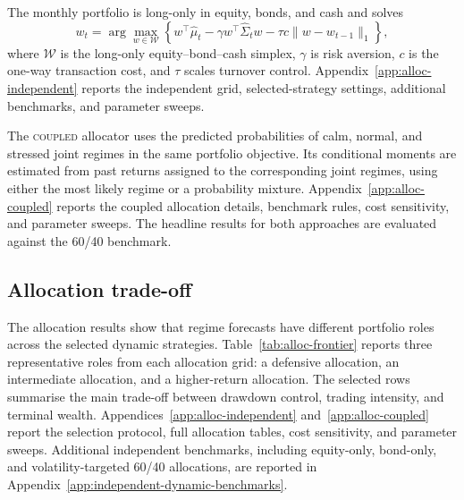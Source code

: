 ﻿\documentclass[10pt]{article}
\newcommand{\Acoup}{\textsc{coupled}}
\begin{document}
The monthly portfolio is long-only in equity, bonds, and cash and solves
\begin{equation}
    w_t
    =
    \arg\max_{w\in\mathcal W}
    \left\{
    w^{\top}\hat\mu_t
    -
    \gamma w^{\top}\hat\Sigma_t w
    -
    \tau c \lVert w-w_{t-1}\rVert_1
    \right\},
    \label{eq:mv}
\end{equation}
where \(\mathcal W\) is the long-only equity--bond--cash simplex, \(\gamma\) is risk aversion,
\(c\) is the one-way transaction cost, and \(\tau\) scales turnover control.
Appendix~\ref{app:alloc-independent} reports the independent grid, selected-strategy
settings, additional benchmarks, and parameter sweeps.

The \Acoup{} allocator uses the predicted probabilities of calm, normal, and stressed joint
regimes in the same portfolio objective. Its conditional moments are estimated from past
returns assigned to the corresponding joint regimes, using either the most likely regime or a
probability mixture. Appendix~\ref{app:alloc-coupled} reports the coupled allocation details,
benchmark rules, cost sensitivity, and parameter sweeps. The headline results for both
approaches are evaluated against the 60/40 benchmark.

\subsection{Allocation trade-off}
\label{sec:alloc-results}
\label{subsec:results-dynamic-allocation}

The allocation results show that regime forecasts have different portfolio roles across the
selected dynamic strategies. Table~\ref{tab:alloc-frontier} reports three representative
roles from each allocation grid: a defensive allocation, an intermediate allocation, and a
higher-return allocation. The selected rows summarise the main trade-off between drawdown
control, trading intensity, and terminal wealth. Appendices~\ref{app:alloc-independent}
and~\ref{app:alloc-coupled} report the selection protocol, full allocation tables, cost
sensitivity, and parameter sweeps. Additional independent benchmarks, including equity-only,
bond-only, and volatility-targeted 60/40 allocations, are reported in
Appendix~\ref{app:independent-dynamic-benchmarks}.
\end{document}
